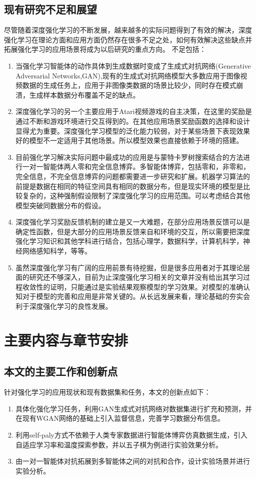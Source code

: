 \subsection{现有研究不足和展望}
尽管随着深度强化学习的不断发展，越来越多的实际问题得到了有效的解决，深度强化学习在理论方面和应用方面仍然存在很多不足之处，如何有效解决这些缺点并拓展强化学习的应用场景将成为以后研究的重点方向。
不足包括：
\begin{enumerate}
	\item 当强化学习智能体的动作具体到生成数据时变成了生成式对抗网络(Generative Adversarial Networks,GAN),现有的生成式对抗网络模型大多数应用于图像视频数据的生成任务上，应用于非图像类数据的场景比较少，同时存在模式崩溃，生成样本数据分布覆盖不足的缺点。
	\item 深度强化学习的另一个主要应用于Atari视频游戏的自主决策，在这里的奖励是通过不断和游戏环境进行交互得到的。在其他应用场景奖励函数的选择和设计显得尤为重要。深度强化学习模型的泛化能力较弱，对于某些场景下表现效果好的模型不一定适用于其他场景。所以模型效果也直接依赖于环境的搭建。
	\item 目前强化学习解决实际问题中最成功的应用是与蒙特卡罗树搜索结合的方法进行一对一智能体两人零和完全信息博弈。多智能体博弈，包括零和，非零和，完全信息，不完全信息博弈的问题都需要进一步研究和扩展。机器学习算法的前提是数据在相同的特征空间具有相同的数据分布，但是现实环境的模型是比较复杂的，这种强制假设限制了深度强化学习的应用范围。可以考虑结合其他模型突破同数据分布的假设。
	\item 深度强化学习奖励反馈机制的建立是又一大难题，在部分应用场景反馈可以是确定性函数，但是大部分的应用场景反馈来自和环境的交互，所以需要把深度强化学习知识和其他学科进行结合，包括心理学，数据科学，计算机科学，神经网络感知科学，等等。
	\item 虽然深度强化学习有广阔的应用前景有待挖掘，但是很多应用者对于其理论层面的研究还不够深入，目前为止深度强化学习相关的文章并没有给出其学习过程收敛性的证明，只能通过是实验结果观察模型的学习效果。对模型的准确认知对于模型的完善和应用是非常关键的。从长远发展来看，理论基础的夯实会利于深度强化学习的良性发展。
\end{enumerate}
\section{主要内容与章节安排}
\subsection{本文的主要工作和创新点}
针对强化学习的应用现状和现有数据集和任务，本文的创新点如下：
\begin{enumerate}
	\item 具体化强化学习任务，利用GAN生成式对抗网络对数据集进行扩充和预测，并在现有WGAN网络的基础上引入监督信息，完善学习数据分布信息。
	\item 利用self-paly方式不依赖于人类专家数据进行智能体博弈仿真数据生成，引入自适应学习率和温度探索参数，并以五子棋为例进行实验效果分析。
	\item 由一对一智能体对抗拓展到多智能体之间的对抗和合作，设计实验场景并进行实验分析。
\end{enumerate}
